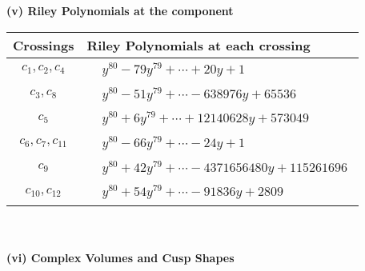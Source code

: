 \documentclass[1p]{elsarticle_modified}
\theoremstyle{definition}
\begin{document}
\newpage\renewcommand{\arraystretch}{1}
\flushleft \textbf{(v) Riley Polynomials at the component}\newline \\
\begin{tabular}{m{50pt}|m{274pt}}
Crossings & \hspace{64pt}Riley Polynomials at each crossing \\
\hline $$\begin{aligned}c_{1},c_{2},c_{4}\end{aligned}$$&$\begin{aligned}
&y^{80}-79 y^{79}+\cdots+20 y+1
\end{aligned}$\\
\hline $$\begin{aligned}c_{3},c_{8}\end{aligned}$$&$\begin{aligned}
&y^{80}-51 y^{79}+\cdots-638976 y+65536
\end{aligned}$\\
\hline $$\begin{aligned}c_{5}\end{aligned}$$&$\begin{aligned}
&y^{80}+6 y^{79}+\cdots+12140628 y+573049
\end{aligned}$\\
\hline $$\begin{aligned}c_{6},c_{7},c_{11}\end{aligned}$$&$\begin{aligned}
&y^{80}-66 y^{79}+\cdots-24 y+1
\end{aligned}$\\
\hline $$\begin{aligned}c_{9}\end{aligned}$$&$\begin{aligned}
&y^{80}+42 y^{79}+\cdots-4371656480 y+115261696
\end{aligned}$\\
\hline $$\begin{aligned}c_{10},c_{12}\end{aligned}$$&$\begin{aligned}
&y^{80}+54 y^{79}+\cdots-91836 y+2809
\end{aligned}$\\
\hline
\end{tabular}\\~\\
\newpage\flushleft \textbf{(vi) Complex Volumes and Cusp Shapes}
\end{document}
